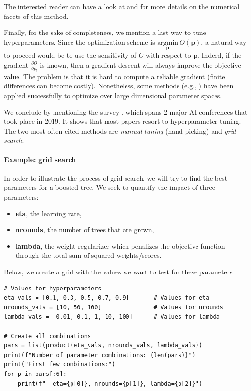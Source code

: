 The interested reader can have a look at \cite{snoek2012practical} and \cite{frazier2018tutorial} for more details on the numerical facets of this method.

Finally, for the sake of completeness, we mention a last way to tune hyperparameters. Since the optimization scheme is $\underset{\textbf{p}}{\text{argmin}} \ O(\textbf{p})$, a natural way to proceed would be to use the sensitivity of $O$ with respect to $\textbf{p}$. Indeed, if the gradient $\frac{\partial O}{\partial p_l}$ is known, then a gradient descent will always improve the objective value. The problem is that it is hard to compute a reliable gradient (finite differences can become costly). Nonetheless, some methods (e.g., \cite{maclaurin2015gradient}) have been applied successfully to optimize over large dimensional parameter spaces.

We conclude by mentioning the survey \cite{bouthillier2020survey}, which spans 2 major AI conferences that took place in 2019. It shows that most papers resort to hyperparameter tuning. The two most often cited methods are \textit{manual tuning} (hand-picking) and \textit{grid search}.

\paragraph{Example: grid search}

In order to illustrate the process of grid search, we will try to find the best parameters for a boosted tree. We seek to quantify the impact of three parameters:

\begin{itemize}
\item \textbf{eta}, the learning rate,
\item \textbf{nrounds}, the number of trees that are grown,
\item \textbf{lambda}, the weight regularizer which penalizes the objective function through the total sum of squared weights/scores.
\end{itemize}

Below, we create a grid with the values we want to test for these parameters.

\begin{verbatim}
# Values for hyperparameters
eta_vals = [0.1, 0.3, 0.5, 0.7, 0.9]       # Values for eta
nrounds_vals = [10, 50, 100]               # Values for nrounds
lambda_vals = [0.01, 0.1, 1, 10, 100]      # Values for lambda

# Create all combinations
pars = list(product(eta_vals, nrounds_vals, lambda_vals))
print(f"Number of parameter combinations: {len(pars)}")
print("First few combinations:")
for p in pars[:6]:
    print(f"  eta={p[0]}, nrounds={p[1]}, lambda={p[2]}")
\end{verbatim}

